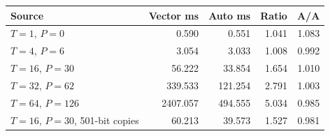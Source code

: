 \begin{center}
\small
\begin{tabular}{@{}lrrrr@{}}
\toprule
Source & Vector ms & Auto ms & Ratio & A/A \\
\midrule
$T=1$, $P=0$ & 0.590 & 0.551 & 1.041 & 1.083 \\
$T=4$, $P=6$ & 3.054 & 3.033 & 1.008 & 0.992 \\
$T=16$, $P=30$ & 56.222 & 33.854 & 1.654 & 1.010 \\
$T=32$, $P=62$ & 339.533 & 121.254 & 2.791 & 1.003 \\
$T=64$, $P=126$ & 2407.057 & 494.555 & 5.034 & 0.985 \\
$T=16$, $P=30$, 501-bit copies & 60.213 & 39.573 & 1.527 & 0.981 \\
\bottomrule
\end{tabular}
\end{center}
